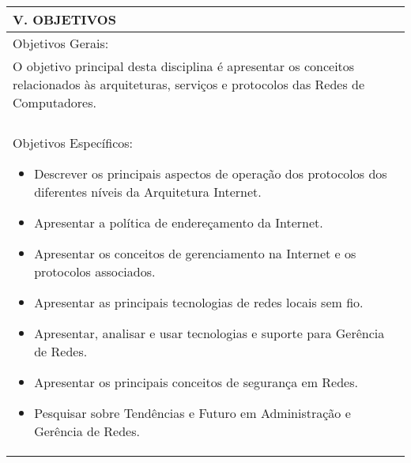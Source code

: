 \documentclass[12pt]{article}
\begin{document}
\begin{longtable}{|L{1.025\textwidth}|} \hline
%
{\bf V. OBJETIVOS } \\ \hline
Objetivos Gerais: \\

O objetivo principal desta disciplina é apresentar os conceitos relacionados às arquiteturas, serviços e protocolos das Redes de Computadores.\\
\\
Objetivos Específicos:
\begin{itemize}
\item Descrever os principais aspectos de operação dos protocolos dos diferentes níveis da Arquitetura Internet.
\item Apresentar a política de endereçamento da Internet.
\item Apresentar os conceitos de gerenciamento na Internet e os protocolos associados.
\item Apresentar as principais tecnologias de redes locais sem fio.
\item Apresentar, analisar e usar tecnologias e suporte para Gerência de Redes.
\item Apresentar os principais conceitos de segurança em Redes.
\item Pesquisar sobre Tendências e Futuro em Administração e Gerência de Redes.
\end{itemize}
\\ \hline
\end{longtable}
\end{document}
